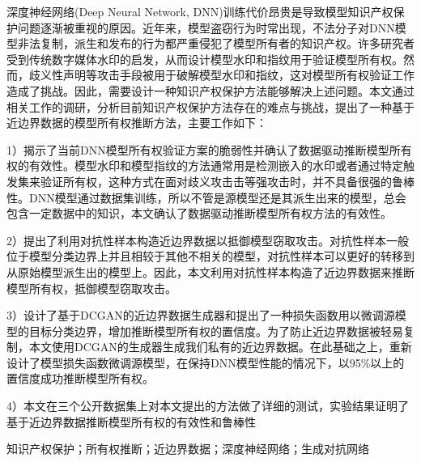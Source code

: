 

\begin{zhaiyao}

深度神经网络(Deep Neural Network, DNN)训练代价昂贵是导致模型知识产权保护问题逐渐被重视的原因。近年来，模型盗窃行为时常出现，不法分子对DNN模型非法复制，派生和发布的行为都严重侵犯了模型所有者的知识产权。许多研究者受到传统数字媒体水印的启发，从而设计模型水印和指纹用于验证模型所有权。然而，歧义性声明等攻击手段被用于破解模型水印和指纹，这对模型所有权验证工作造成了挑战。因此，需要设计一种知识产权保护方法能够解决上述问题。本文通过相关工作的调研，分析目前知识产权保护方法存在的难点与挑战，提出了一种基于近边界数据的模型所有权推断方法，主要工作如下：

1）揭示了当前DNN模型所有权验证方案的脆弱性并确认了数据驱动推断模型所有权的有效性。模型水印和模型指纹的方法通常用是检测嵌入的水印或者通过特定触发集来验证所有权，这种方式在面对歧义攻击击等强攻击时，并不具备很强的鲁棒性。DNN模型通过数据集训练，所以不管是源模型还是其派生出来的模型，总会包含一定数据中的知识，本文确认了数据驱动推断模型所有权方法的有效性。

2）提出了利用对抗性样本构造近边界数据以抵御模型窃取攻击。对抗性样本一般位于模型分类边界上并且相较于其他不相关的模型，对抗性样本可以更好的转移到从原始模型派生出的模型上。因此，本文利用对抗性样本构造了近边界数据来推断模型所有权，抵御模型窃取攻击。

3）设计了基于DCGAN的近边界数据生成器和提出了一种损失函数用以微调源模型的目标分类边界，增加推断模型所有权的置信度。为了防止近边界数据被轻易复制，本文使用DCGAN的生成器生成我们私有的近边界数据。在此基础之上，重新设计了模型损失函数微调源模型，在保持DNN模型性能的情况下，以95\%以上的置信度成功推断模型所有权。

4）本文在三个公开数据集上对本文提出的方法做了详细的测试，实验结果证明了基于近边界数据推断模型所有权的有效性和鲁棒性


\end{zhaiyao}



\begin{guanjianci}
知识产权保护；所有权推断；近边界数据；深度神经网络；生成对抗网络
\end{guanjianci}



